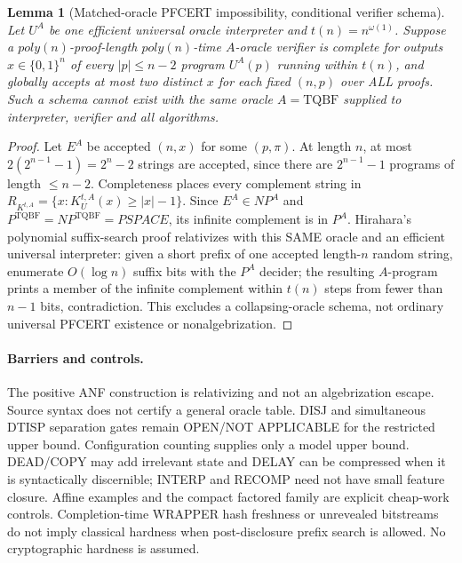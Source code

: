 \documentclass[11pt]{article}
\newtheorem{lemma}[theorem]{Lemma}
\begin{document}
\begin{lemma}[Matched-oracle PFCERT impossibility, conditional verifier schema]
Let $U^A$ be one efficient universal oracle interpreter and $t(n)=n^{\omega(1)}$. Suppose a $poly(n)$-proof-length $poly(n)$-time $A$-oracle verifier is complete for outputs $x\in\{0,1\}^n$ of every $|p|\le n-2$ program $U^A(p)$ running within $t(n)$, and globally accepts at most two distinct $x$ for each fixed $(n,p)$ over ALL proofs. Such a schema cannot exist with the same oracle $A=\mathrm{TQBF}$ supplied to interpreter, verifier and all algorithms.
\end{lemma}
\begin{proof}
Let $E^A$ be accepted $(n,x)$ for some $(p,\pi)$. At length $n$, at most $2(2^{n-1}-1)=2^n-2$ strings are accepted, since there are $2^{n-1}-1$ programs of length $\le n-2$. Completeness places every complement string in $R_{K^{t,A}}=\{x:K_U^{t,A}(x)\ge |x|-1\}$. Since $E^A\in NP^A$ and $P^{\mathrm{TQBF}}=NP^{\mathrm{TQBF}}=PSPACE$, its infinite complement is in $P^A$. Hirahara's polynomial suffix-search proof relativizes with this SAME oracle and an efficient universal interpreter: given a short prefix of one accepted length-$n$ random string, enumerate $O(\log n)$ suffix bits with the $P^A$ decider; the resulting $A$-program prints a member of the infinite complement within $t(n)$ steps from fewer than $n-1$ bits, contradiction. This excludes a collapsing-oracle schema, not ordinary universal PFCERT existence or nonalgebrization.
\end{proof}
\paragraph{Barriers and controls.}
The positive ANF construction is relativizing and not an algebrization escape. Source syntax does not certify a general oracle table. DISJ and simultaneous DTISP separation gates remain OPEN/NOT APPLICABLE for the restricted upper bound. Configuration counting supplies only a model upper bound. DEAD/COPY may add irrelevant state and DELAY can be compressed when it is syntactically discernible; INTERP and RECOMP need not have small feature closure. Affine examples and the compact factored family are explicit cheap-work controls. Completion-time WRAPPER hash freshness or unrevealed bitstreams do not imply classical hardness when post-disclosure prefix search is allowed. No cryptographic hardness is assumed.
\end{document}
